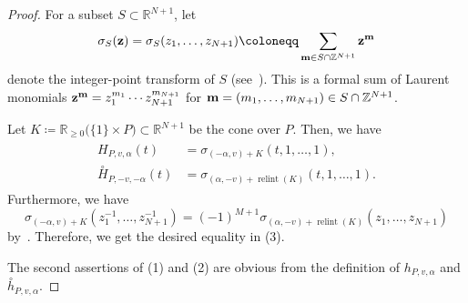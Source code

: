 \documentclass[ALCO,published]{cedram}
\theoremstyle{remark}
\begin{document}
\begin{proof}
For a subset $S \subset \mathbb{R}^{N+1}$, let 
\[
\sigma _S({\bf z}) = \sigma _S (z_1, \ldots, z_{N+1}) \coloneqq  \sum _{{\bf m} \in S \cap \mathbb{Z}^{N+1}} {\bf z}^{\bf m}
\]
denote the integer-point transform of $S$ (see~\cite[Section 3.3]{BR}). 
This is a formal sum of Laurent monomials ${\bf z}^{\bf m} = z_1^{m_1} \cdots z_{N+1}^{m_{N+1}}$ 
for ${\bf m} = (m_1, \ldots , m_{N+1}) \in S \cap \mathbb{Z}^{N+1}$. 

Let $K \coloneqq  \mathbb{R}_{\ge 0} \bigl( \{ 1 \} \times P \bigr) \subset \mathbb{R}^{N+1}$ be the cone over $P$. 
Then, we have 
\begin{align*}
\begin{split}
H_{P,v,\alpha} (t) &= \sigma _{(- \alpha, v) + K} (t, 1 , \ldots, 1), \\
\overset{\circ}{H}_{P, -v, - \alpha}(t) &= \sigma _{(\alpha, - v) + \operatorname{relint}(K)} (t, 1 , \ldots, 1). 
\end{split} \tag{$\spadesuit$}
\end{align*}
Furthermore, we have 
\[
\sigma _{(- \alpha, v) + K} (z_1^{-1}, \ldots, z_{N+1}^{-1}) 
= (-1)^{M+1} \sigma _{(\alpha, -v) + \operatorname{relint}(K)} (z_1, \ldots, z_{N+1})
\]
by~\cite[Exercises 4.5 and 4.6]{BR}. Therefore, we get the desired equality in (3). 

The second assertions of (1) and (2) are obvious from the definition of $h_{P, v, \alpha}$ and $\overset{\circ}{h}_{P, v, \alpha}$. 


\end{proof}
\end{document}
